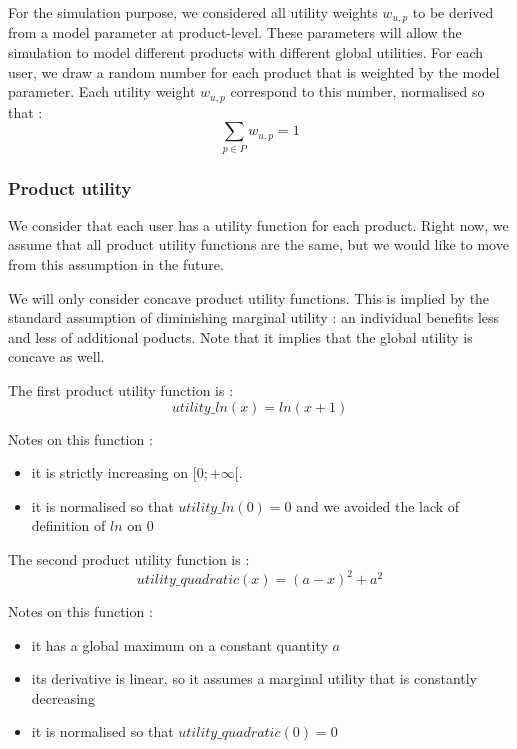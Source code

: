 For the simulation purpose, we considered all utility weights $w_{u, p}$ to be derived from a model parameter at product-level.
These parameters will allow the simulation to model different products with different global utilities.
For each user, we draw a random number for each product that is weighted by the model parameter.
Each utility weight $w_{u, p}$ correspond to this number, normalised so that :
\begin{equation}
    \label{eq:weight_normalisation}
    \sum_{p\in P}w_{u, p} = 1
\end{equation}

\subsubsection{Product utility}
We consider that each user has a utility function for each product.
Right now, we assume that all product utility functions are the same, but we would like to move from this assumption in the future.

We will only consider concave product utility functions.
This is implied by the standard assumption of diminishing marginal utility : an individual benefits less and less of additional poducts.
Note that it implies that the global utility is concave as well.

The first product utility function is :
\begin{equation}
    utility\_ln(x) = ln(x + 1)
\end{equation}

Notes on this function :
\begin{itemize}
    \item it is strictly increasing on $[0; +\infty[$.
    \item it is normalised so that $utility\_ln(0) = 0$ and we avoided the lack of definition of $ln$ on $0$
\end{itemize}

The second product utility function is :
\begin{equation}
    utility\_quadratic(x) = (a - x)^2 + a^2
\end{equation}

Notes on this function :
\begin{itemize}
    \item it has a global maximum on a constant quantity $a$
    \item its derivative is linear, so it assumes a marginal utility that is constantly decreasing
    \item it is normalised so that $utility\_quadratic(0) = 0$
\end{itemize}

